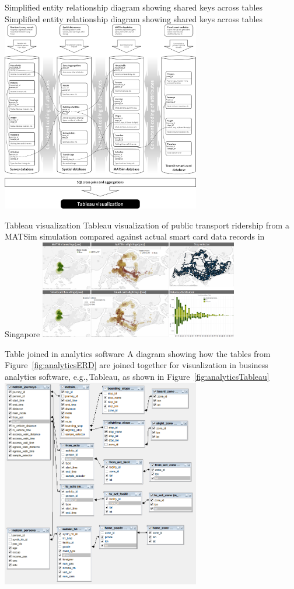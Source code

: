 \createfigure%
{Simplified entity relationship diagram showing shared keys across tables}%
{Simplified entity relationship diagram showing shared keys across tables}%
{\label{fig:analyticsERD}}%
{\includegraphics[width=0.65\textwidth, angle=0]{extending/figures/businessanalytics/schema}}%
{}

\createfigure%
{Tableau visualization}%
{Tableau visualization of public transport ridership from a MATSim simulation compared against actual smart card data records in Singapore}%
{\label{fig:analyticsTableau}}%
{\includegraphics[width=0.65\textwidth, angle=0]{extending/figures/businessanalytics/tableau.png}}%
{}

\createfigure%
{Table joined in analytics software}%
{A diagram showing how the tables from Figure~\ref{fig:analyticsERD} are joined together for visualization in business analytics software, e.g.,\,Tableau, as shown in Figure~\ref{fig:analyticsTableau}}%
{\label{fig:analyticsJoin}}%
{\includegraphics[width=0.65\textwidth, angle=0]{extending/figures/businessanalytics/join}}%
{}

